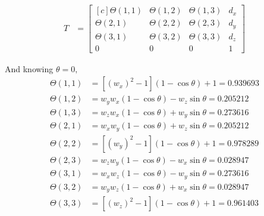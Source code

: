 \documentclass[onecolumn,10pt]{jhwhw}
\begin{document}
\begin{align*}
T &=
\begin{bmatrix*}[c]
\Theta \left(1, 1 \right ) & \Theta \left(1, 2 \right ) & \Theta \left(1, 3 \right ) & d_x \\
\Theta \left(2, 1 \right ) & \Theta \left(2, 2 \right ) & \Theta \left(2, 3 \right ) & d_y \\
\Theta \left(3, 1 \right ) & \Theta \left(3, 2 \right ) & \Theta \left(3, 3 \right ) & d_z \\
0 & 0 & 0 & 1
\end{bmatrix*}
\end{align*}

And knowing $\theta = 0,$
\begin{align*}
\Theta \left(1, 1 \right ) &= [\left ( w_x \right )^2 - 1 ] \left ( 1 - \cos \theta \right ) + 1 = 0.939693\\
\Theta \left(1, 2 \right ) &= w_y w_x \left ( 1 - \cos \theta \right ) - w_z \sin \theta = 0.205212\\
\Theta \left(1, 3 \right ) &= w_z w_x \left ( 1 - \cos \theta \right ) + w_y \sin \theta = 0.273616\\
\Theta \left(2, 1 \right ) &= w_x w_y \left ( 1 - \cos \theta \right ) + w_z \sin \theta = 0.205212\\
\Theta \left(2, 2 \right ) &= [\left ( w_y \right )^2 - 1 ] \left ( 1 - \cos \theta \right ) + 1 = 0.978289\\
\Theta \left(2, 3 \right ) &= w_z w_y \left ( 1 - \cos \theta \right ) - w_x \sin \theta = 0.028947\\
\Theta \left(3, 1 \right ) &= w_x w_z \left ( 1 - \cos \theta \right ) - w_y \sin \theta = 0.273616\\
\Theta \left(3, 2 \right ) &= w_y w_z \left ( 1 - \cos \theta \right ) + w_x \sin \theta = 0.028947\\
\Theta \left(3, 3 \right ) &= [\left ( w_z \right )^2 - 1 ] \left ( 1 - \cos \theta \right ) + 1 = 0.961403\\
\end{align*}

\end{document}
